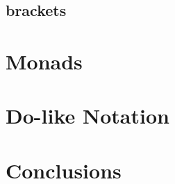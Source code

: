 \documentclass[12pt,fleqn]{article}
\begin{document}
\subsection*{brackets}



\section*{Monads}
 
\section*{Do-like Notation}
 


\section*{Conclusions}
\end{document}
